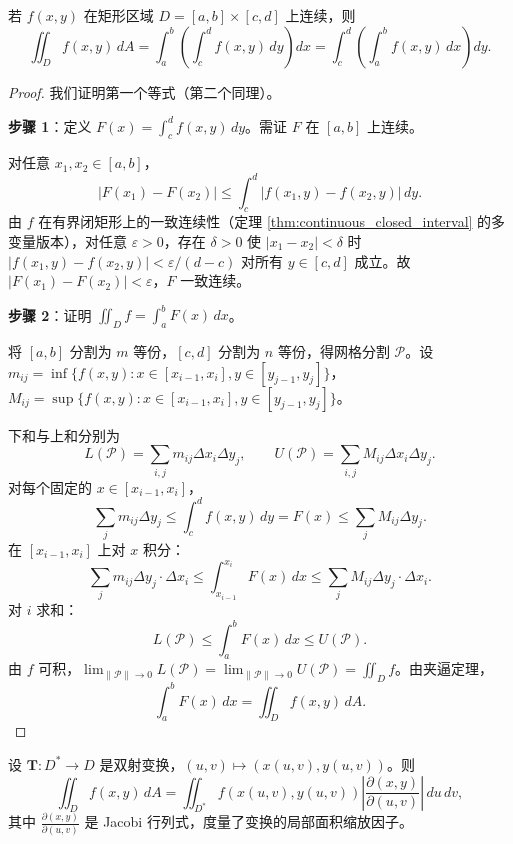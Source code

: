 \begin{theorem}\label{thm:fubini}
若 $f(x,y)$ 在矩形区域 $D = [a,b] \times [c,d]$ 上连续，则
\[\iint_D f(x,y)\,dA = \int_a^b \left( \int_c^d f(x,y)\,dy \right) dx = \int_c^d \left( \int_a^b f(x,y)\,dx \right) dy.\]
\end{theorem}

\begin{proof}
我们证明第一个等式（第二个同理）。

\textbf{步骤 1}：定义 $F(x) = \int_c^d f(x,y)\,dy$。需证 $F$ 在 $[a,b]$ 上连续。

对任意 $x_1, x_2 \in [a,b]$，
\[
|F(x_1) - F(x_2)| \le \int_c^d |f(x_1,y) - f(x_2,y)|\,dy.
\]
由 $f$ 在有界闭矩形上的一致连续性（定理 \ref{thm:continuous_closed_interval} 的多变量版本），对任意 $\varepsilon > 0$，存在 $\delta > 0$ 使 $|x_1 - x_2| < \delta$ 时 $|f(x_1,y) - f(x_2,y)| < \varepsilon/(d-c)$ 对所有 $y \in [c,d]$ 成立。故 $|F(x_1) - F(x_2)| < \varepsilon$，$F$ 一致连续。

\textbf{步骤 2}：证明 $\iint_D f = \int_a^b F(x)\,dx$。

将 $[a,b]$ 分割为 $m$ 等份，$[c,d]$ 分割为 $n$ 等份，得网格分割 $\mathcal{P}$。设 $m_{ij} = \inf\{f(x,y) : x \in [x_{i-1}, x_i], y \in [y_{j-1}, y_j]\}$，$M_{ij} = \sup\{f(x,y) : x \in [x_{i-1}, x_i], y \in [y_{j-1}, y_j]\}$。

下和与上和分别为
\[
L(\mathcal{P}) = \sum_{i,j} m_{ij}\Delta x_i \Delta y_j, \qquad U(\mathcal{P}) = \sum_{i,j} M_{ij}\Delta x_i \Delta y_j.
\]
对每个固定的 $x \in [x_{i-1}, x_i]$，
\[
\sum_j m_{ij}\Delta y_j \le \int_c^d f(x,y)\,dy = F(x) \le \sum_j M_{ij}\Delta y_j.
\]
在 $[x_{i-1}, x_i]$ 上对 $x$ 积分：
\[
\sum_j m_{ij}\Delta y_j \cdot \Delta x_i \le \int_{x_{i-1}}^{x_i} F(x)\,dx \le \sum_j M_{ij}\Delta y_j \cdot \Delta x_i.
\]
对 $i$ 求和：
\[
L(\mathcal{P}) \le \int_a^b F(x)\,dx \le U(\mathcal{P}).
\]
由 $f$ 可积，$\lim_{\|\mathcal{P}\|\to 0} L(\mathcal{P}) = \lim_{\|\mathcal{P}\|\to 0} U(\mathcal{P}) = \iint_D f$。由夹逼定理，
\[
\int_a^b F(x)\,dx = \iint_D f(x,y)\,dA.
\]
\end{proof}

\begin{proposition}[多重积分的变量代换]\label{prop:change_of_variables}
设 $\mathbf{T}: D^* \to D$ 是双射变换，$(u, v) \mapsto (x(u,v), y(u,v))$。则
\[\iint_D f(x, y)\,dA = \iint_{D^*} f(x(u,v), y(u,v)) \left|\frac{\partial(x, y)}{\partial(u, v)}\right|\,du\,dv,\]
其中 $\frac{\partial(x, y)}{\partial(u, v)}$ 是 Jacobi 行列式，度量了变换的局部面积缩放因子。
\end{proposition}

